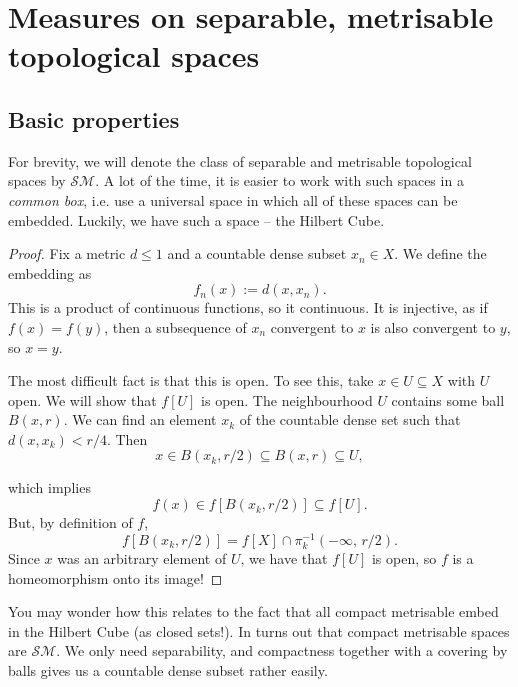 \chapter{Measures on separable, metrisable topological spaces}

\section{Basic properties}

For brevity, we will denote the class of separable and metrisable topological spaces by \( \mathcal{SM} \). A lot of the time, it is easier to work with such spaces in a \emph{common box}, i.e. use a universal space in which all of these spaces can be embedded. Luckily, we have such a space -- the Hilbert Cube.


\begin{proof}
    Fix a metric \( d \leqslant 1 \) and a countable dense subset \( x_n \in X \). We define the embedding as 
    \[ 
       f_n(x) := d(x, x_n). 
   \]
   This is a product of continuous functions, so it continuous. It is injective, as if \( f(x) = f(y) \), then a subsequence of \( x_n \) convergent to \( x \) is also convergent to \( y \), so \( x = y \). 

   The most difficult fact is that this is open. To see this, take \( x \in U \subseteq X \) with \( U \) open. We will show that \( f[U] \) is open. The neighbourhood \( U \) contains some ball \( B(x, r) \). We can find an element \( x_k \) of the countable dense set such that \( d(x, x_k) < r/4 \). Then
   \[ 
      x \in B(x_k, r/2) \subseteq B(x, r) \subseteq U,
  \]

  which implies
  \[ 
      f(x) \in f \left[ B(x_k, r/2) \right] \subseteq f[U]. 
 \]
 But, by definition of \( f \),
 \[ 
     f \left[ B(x_k, r/2) \right] = f[X] \cap \pi_k^{-1} (-\infty,\, r/2).
\]
Since \( x \) was an arbitrary element of \( U \), we have that \( f[U] \) is open, so \( f \) is a homeomorphism onto its image!
\end{proof}

You may wonder how this relates to the fact that all compact metrisable embed in the Hilbert Cube (as closed sets!). In turns out that compact metrisable spaces are \( \mathcal{SM} \). We only need separability, and compactness together with a covering by balls gives us a countable dense subset rather easily.

